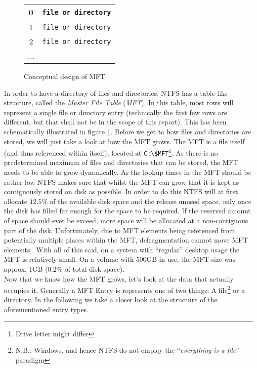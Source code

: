 \begin{figure}[h]
	\centering

		\begin{tabularx}{\columnwidth}{|cX|}
			\hline
			0 & \texttt{file or directory} \\
			\hline
			1 & \texttt{file or directory} \\
			\hline
			2 & \texttt{file or directory} \\
			\hline
			... & \\
			\hline
		\end{tabularx}
	
	\caption{Conceptual design of MFT\label{fig:mft_concept}}
\end{figure}
In order to have a directory of files and directories, NTFS has a table-like structure, called the \textit{Master File Table} (\textit{MFT}). In this table, most rows will represent a single file or directory entry (technically the first few rows are different, but that shall not be in the scope of this report). This has been schematically illustrated in figure \ref{fig:mft_concept}. Before we get to how files and directories are stored, we will just take a look at how the MFT grows. The MFT is a file itself (and thus referenced within itself), located at \texttt{C:\textbackslash\$MFT}\footnote{Drive letter might differ}.\cite{RUSSINOVICH_ET_AL:2012:WI} As there is no predetermined maximum of files and directories that can be stored, the MFT needs to be able to grow dynamically. As the lookup times in the MFT should be rather low NTFS makes sure that whilst the MFT can grow that it is kept as contiguously stored on disk as possible. In order to do this NTFS will at first allocate $12.5\%$ of the available disk space and the release unused space, only once the disk has filled far enough for the space to be required. If the reserved amount of space should ever be exceed, more space will be allocated at a non-contiguous part of the disk. Unfortunately, due to MFT elements being referenced from potentially multiple places within the MFT, defragmentation cannot move MFT elements.\cite{microsoftinc:2018:HNR}. With all of this said, on a system with ``regular'' desktop usage the MFT is relatively small. On a volume with 500GB in use, the MFT size was approx. 1GB ($0.2$\% of total disk space).\\  Now that we know how the MFT grows, let's look at the data that actually occupies it. Generally a MFT Entry is represents one of two things: A file\footnote{N.B.: Windows, and hence NTFS do not employ the ``\textit{everything is a file}''-paradigm} or a directory. In the following we take a closer look at the structure of the aforementioned entry types.\\
